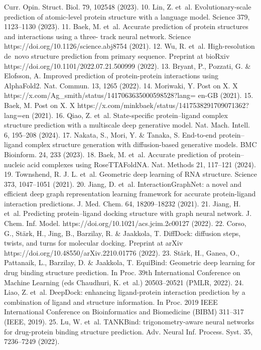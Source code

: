 Curr. Opin. Struct. Biol. 79, 102548 (2023).
10.
Lin, Z. et al. Evolutionary-scale prediction of atomic-level protein structure with a
language model. Science 379, 1123–1130 (2023).
11.
Baek, M. et al. Accurate prediction of protein structures and interactions using a three-
track neural network. Science https://doi.org/10.1126/science.abj8754 (2021).
12.
Wu, R. et al. High-resolution de novo structure prediction from primary sequence.
Preprint at bioRxiv https://doi.org/10.1101/2022.07.21.500999 (2022).
13.
Bryant, P., Pozzati, G. \& Elofsson, A. Improved prediction of protein-protein interactions
using AlphaFold2. Nat. Commun. 13, 1265 (2022).
14.
Moriwaki, Y. Post on X. X https://x.com/Ag\_smith/status/1417063635000598528?lang=
en-GB (2021).
15.
Baek, M. Post on X. X https://x.com/minkbaek/status/1417538291709071362?lang=en
(2021).
16.
Qiao, Z. et al. State-specific protein–ligand complex structure prediction with a multiscale
deep generative model. Nat. Mach. Intell. 6, 195–208 (2024).
17.
Nakata, S., Mori, Y. \& Tanaka, S. End-to-end protein–ligand complex structure generation
with diffusion-based generative models. BMC Bioinform. 24, 233 (2023).
18.
Baek, M. et al. Accurate prediction of protein–nucleic acid complexes using
RoseTTAFoldNA. Nat. Methods 21, 117–121 (2024).
19.
Townshend, R. J. L. et al. Geometric deep learning of RNA structure. Science 373,
1047–1051 (2021).
20.	 Jiang, D. et al. InteractionGraphNet: a novel and efficient deep graph representation
learning framework for accurate protein-ligand interaction predictions. J. Med. Chem. 64,
18209–18232 (2021).
21.
Jiang, H. et al. Predicting protein–ligand docking structure with graph neural network.
J. Chem. Inf. Model. https://doi.org/10.1021/acs.jcim.2c00127 (2022).
22.	 Corso, G., Stärk, H., Jing, B., Barzilay, R. \& Jaakkola, T. DiffDock: diffusion steps, twists, and
turns for molecular docking. Preprint at arXiv https://doi.org/10.48550/arXiv.2210.01776
(2022).
23.	 Stärk, H., Ganea, O., Pattanaik, L., Barzilay, D. \& Jaakkola, T. EquiBind: Geometric deep
learning for drug binding structure prediction. In Proc. 39th International Conference on
Machine Learning (eds Chaudhuri, K. et al.) 20503–20521 (PMLR, 2022).
24.	 Liao, Z. et al. DeepDock: enhancing ligand-protein interaction prediction by a
combination of ligand and structure information. In Proc. 2019 IEEE International
Conference on Bioinformatics and Biomedicine (BIBM) 311–317 (IEEE, 2019).
25.	 Lu, W. et al. TANKBind: trigonometry-aware neural networks for drug-protein binding
structure prediction. Adv. Neural Inf. Process. Syst. 35, 7236–7249 (2022).
